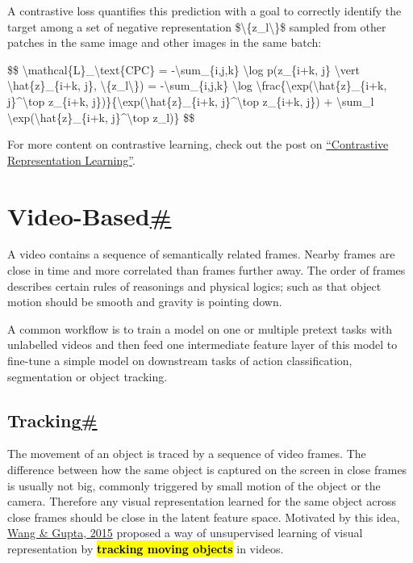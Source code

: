 A contrastive loss quantifies this prediction with a goal to correctly identify the target among a set of negative representation \$\textbackslash\{z\_l\textbackslash\}\$ sampled from other patches in the same image and other images in the same batch:

\$\$ \textbackslash mathcal\{L\}\_\textbackslash text\{CPC\} = -\textbackslash sum\_\{i,j,k\} \textbackslash log p(z\_\{i+k, j\} \textbackslash vert \textbackslash hat\{z\}\_\{i+k, j\}, \textbackslash\{z\_l\textbackslash\}) = -\textbackslash sum\_\{i,j,k\} \textbackslash log \textbackslash frac\{\textbackslash exp(\textbackslash hat\{z\}\_\{i+k, j\}\^{}\textbackslash top z\_\{i+k, j\})\}\{\textbackslash exp(\textbackslash hat\{z\}\_\{i+k, j\}\^{}\textbackslash top z\_\{i+k, j\}) + \textbackslash sum\_l \textbackslash exp(\textbackslash hat\{z\}\_\{i+k, j\}\^{}\textbackslash top z\_l)\} \$\$

For more content on contrastive learning, check out the post on \href{https://lilianweng.github.io/posts/2021-05-31-contrastive/}{``Contrastive Representation Learning''}.

\section{\texorpdfstring{Video-Based\hyperref[video-based]{\#}}{Video-Based\#}}\label{video-based}

A video contains a sequence of semantically related frames. Nearby frames are close in time and more correlated than frames further away. The order of frames describes certain rules of reasonings and physical logics; such as that object motion should be smooth and gravity is pointing down.

A common workflow is to train a model on one or multiple pretext tasks with unlabelled videos and then feed one intermediate feature layer of this model to fine-tune a simple model on downstream tasks of action classification, segmentation or object tracking.

\subsection{\texorpdfstring{Tracking\hyperref[tracking]{\#}}{Tracking\#}}\label{tracking}

The movement of an object is traced by a sequence of video frames. The difference between how the same object is captured on the screen in close frames is usually not big, commonly triggered by small motion of the object or the camera. Therefore any visual representation learned for the same object across close frames should be close in the latent feature space. Motivated by this idea, \href{https://arxiv.org/abs/1505.00687}{Wang \& Gupta, 2015} proposed a way of unsupervised learning of visual representation by \hl{\textbf{tracking moving objects}} in videos.

